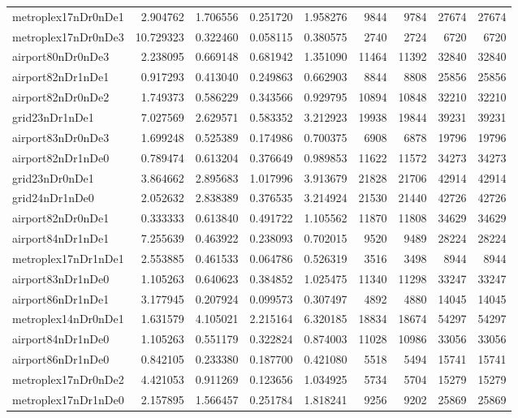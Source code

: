 \begin{longtable}{|l|r|r|r|r|r|r|r|r|}
metroplex17nDr0nDe1 & 2.904762 & 1.706556 & 0.251720 & 1.958276 & 9844 & 9784 & 27674 & 27674 \\
metroplex17nDr0nDe3 & 10.729323 & 0.322460 & 0.058115 & 0.380575 & 2740 & 2724 & 6720 & 6720 \\
airport80nDr0nDe3 & 2.238095 & 0.669148 & 0.681942 & 1.351090 & 11464 & 11392 & 32840 & 32840 \\
airport82nDr1nDe1 & 0.917293 & 0.413040 & 0.249863 & 0.662903 & 8844 & 8808 & 25856 & 25856 \\
airport82nDr0nDe2 & 1.749373 & 0.586229 & 0.343566 & 0.929795 & 10894 & 10848 & 32210 & 32210 \\
grid23nDr1nDe1 & 7.027569 & 2.629571 & 0.583352 & 3.212923 & 19938 & 19844 & 39231 & 39231 \\
airport83nDr0nDe3 & 1.699248 & 0.525389 & 0.174986 & 0.700375 & 6908 & 6878 & 19796 & 19796 \\
airport82nDr1nDe0 & 0.789474 & 0.613204 & 0.376649 & 0.989853 & 11622 & 11572 & 34273 & 34273 \\
grid23nDr0nDe1 & 3.864662 & 2.895683 & 1.017996 & 3.913679 & 21828 & 21706 & 42914 & 42914 \\
grid24nDr1nDe0 & 2.052632 & 2.838389 & 0.376535 & 3.214924 & 21530 & 21440 & 42726 & 42726 \\
airport82nDr0nDe1 & 0.333333 & 0.613840 & 0.491722 & 1.105562 & 11870 & 11808 & 34629 & 34629 \\
airport84nDr1nDe1 & 7.255639 & 0.463922 & 0.238093 & 0.702015 & 9520 & 9489 & 28224 & 28224 \\
metroplex17nDr1nDe1 & 2.553885 & 0.461533 & 0.064786 & 0.526319 & 3516 & 3498 & 8944 & 8944 \\
airport83nDr1nDe0 & 1.105263 & 0.640623 & 0.384852 & 1.025475 & 11340 & 11298 & 33247 & 33247 \\
airport86nDr1nDe1 & 3.177945 & 0.207924 & 0.099573 & 0.307497 & 4892 & 4880 & 14045 & 14045 \\
metroplex14nDr0nDe1 & 1.631579 & 4.105021 & 2.215164 & 6.320185 & 18834 & 18674 & 54297 & 54297 \\
airport84nDr1nDe0 & 1.105263 & 0.551179 & 0.322824 & 0.874003 & 11028 & 10986 & 33056 & 33056 \\
airport86nDr1nDe0 & 0.842105 & 0.233380 & 0.187700 & 0.421080 & 5518 & 5494 & 15741 & 15741 \\
metroplex17nDr0nDe2 & 4.421053 & 0.911269 & 0.123656 & 1.034925 & 5734 & 5704 & 15279 & 15279 \\
metroplex17nDr1nDe0 & 2.157895 & 1.566457 & 0.251784 & 1.818241 & 9256 & 9202 & 25869 & 25869 \\

\end{longtable}
